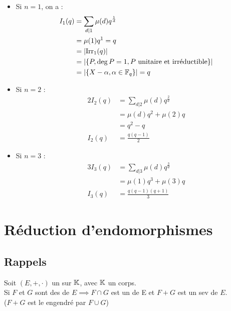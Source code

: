 \documentclass[]{report}
\begin{document}
    \begin{ex}{}{}
        \begin{itemize}
            \item Si $n=1$, on a :
            \begin{align*}
                I_1(q)&=\sum_{d|1}\mu(d)q^{\frac{1}{d}}\\
                &=\mu(1)q^{1}=q\\
                &=|\text{Irr}_1(q)|\\
                &=|\{P,\deg P =1, P\text{ unitaire et irréductible}\}|\\
                &=|\{X-\alpha,\alpha\in\mathbb{F}_q\}|=q
            \end{align*}
            \item Si $n=2$ :
            \begin{align*}
                2I_2(q)&=\sum_{d|2}\mu(d) q^{\frac{2}{d}}\\
                &=\mu(d)q^2+\mu(2)q\\
                &=q^2-q\\
                I_2(q)&=\frac{q(q-1)}{2}
            \end{align*}
            \item Si $n=3$ :
            \begin{align*}
                3I_3(q)&=\sum_{d|3}\mu(d)q^{\frac{3}{d}}\\
                &=\mu(1)q^3+\mu(3)q\\
                I_3(q)&=\frac{q(q-1)(q+1)}{3}
            \end{align*}
        \end{itemize}
    \end{ex}

    \chapter{Réduction d'endomorphismes}

    \section{Rappels}

    Soit $(E,+,\cdot)$ un \ev sur $\mathbb{K}$, avec $\mathbb{K}$ un corps.\\
    Si $F$ et $G$ sont des \sevs de $E\implies F\cap G$ est un \sev de E et $F+G$ est un sev de $E$.\\
    ($F+G$ est le \sev engendré par $F\cup G$)
\end{document}
